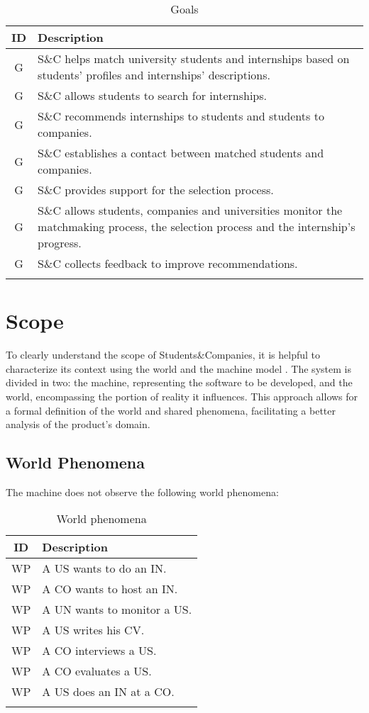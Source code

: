 \setcounter{g}{1}
\newcommand{\gc}{\theg\stepcounter{g}}
\renewcommand{\arraystretch}{1.5}
\begin{longtable}{|c|p{12.5cm}|}
    \hline \rowcolor{polimiblue!40}
    \textbf{ID} & \textbf{Description} \\ \hline
    G\gc & S\&C helps match university students and internships based on students' profiles and internships' descriptions. \\ \hline
    G\gc & S\&C allows students to search for internships. \\ \hline
    G\gc & S\&C recommends internships to students and students to companies. \\ \hline
    G\gc & S\&C establishes a contact between matched students and companies. \\ \hline
    G\gc & S\&C provides support for the selection process. \\ \hline
    G\gc & S\&C allows students, companies and universities monitor the matchmaking process, the selection process and the internship's progress. \\ \hline
    G\gc & S\&C collects feedback to improve recommendations. \\ \hline
\caption{Goals}
\end{longtable}

\section{Scope}
To clearly understand the scope of Students\&Companies, it is helpful to characterize its context using the world and the machine model \cite{jackson1995}.
The system is divided in two: the machine, representing the software to be developed, and the world, encompassing the portion of reality it influences.
This approach allows for a formal definition of the world and shared phenomena, facilitating a better analysis of the product's domain.

\subsection{World Phenomena}
The machine does not observe the following world phenomena:

\setcounter{wp}{1}
\newcommand{\wpc}{\thewp\stepcounter{wp}}
\renewcommand{\arraystretch}{1.5}
\begin{longtable}{|c|p{10.5cm}|}
    \hline \rowcolor{polimiblue!40}
    \textbf{ID} & \textbf{Description} \\ \hline
    WP\wpc & A US wants to do an IN. \\ \hline
    WP\wpc & A CO wants to host an IN. \\ \hline
    WP\wpc & A UN wants to monitor a US. \\ \hline
    WP\wpc & A US writes his CV. \\ \hline
    WP\wpc & A CO interviews a US. \\ \hline
    WP\wpc & A CO evaluates a US. \\ \hline
    WP\wpc & A US does an IN at a CO. \\ \hline
\caption{World phenomena}
\end{longtable}

